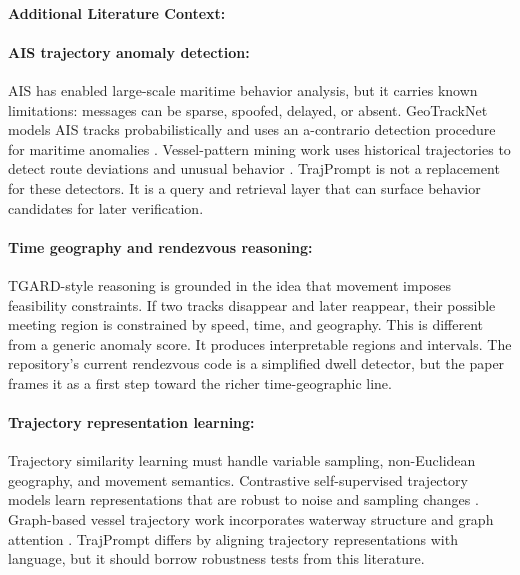 \documentclass{article}
\begin{document}
\paragraph{Additional Literature Context:}

\paragraph{AIS trajectory anomaly detection:}

AIS has enabled large-scale maritime behavior analysis, but it carries known limitations: messages can be sparse, spoofed, delayed, or absent. GeoTrackNet models AIS tracks probabilistically and uses an a-contrario detection procedure for maritime anomalies \citep{nguyen2020geotracknet}. Vessel-pattern mining work uses historical trajectories to detect route deviations and unusual behavior \citep{pallotta2013vessel}. TrajPrompt is not a replacement for these detectors. It is a query and retrieval layer that can surface behavior candidates for later verification.

\paragraph{Time geography and rendezvous reasoning:}

TGARD-style reasoning is grounded in the idea that movement imposes feasibility constraints. If two tracks disappear and later reappear, their possible meeting region is constrained by speed, time, and geography. This is different from a generic anomaly score. It produces interpretable regions and intervals. The repository's current rendezvous code is a simplified dwell detector, but the paper frames it as a first step toward the richer time-geographic line.

\paragraph{Trajectory representation learning:}

Trajectory similarity learning must handle variable sampling, non-Euclidean geography, and movement semantics. Contrastive self-supervised trajectory models learn representations that are robust to noise and sampling changes \citep{yao2022cstrm}. Graph-based vessel trajectory work incorporates waterway structure and graph attention \citep{li2023clais}. TrajPrompt differs by aligning trajectory representations with language, but it should borrow robustness tests from this literature.
\end{document}
